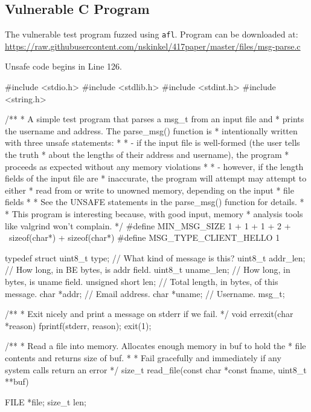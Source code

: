 \begin{appendices}

\chapter{Vulnerable C Program}
\label{app:vuln-full}

The vulnerable test program fuzzed using \texttt{afl}. Program can be
downloaded at: \url{https://raw.githubusercontent.com/nskinkel/417paper/master/files/msg-parse.c}

Unsafe code begins in Line 126.

\renewcommand\mylstcaption{Caption goes here.}
\begin{TCBlisting}[language={[ANSI]C},basicstyle=\scriptsize,caption={\mylstcaption}]
#include <stdio.h>
#include <stdlib.h>
#include <stdint.h>
#include <string.h>

/**
 * A simple test program that parses a msg_t from an input file and 
 * prints the username and address. The parse_msg() function is
 * intentionally written with three unsafe statements:
 *
 *     - if the input file is well-formed (the user tells the truth
 *       about the lengths of their address and username), the program
 *       proceeds as expected without any memory violations
 *
 *     - however, if the length fields of the input file are
 *       inaccurate, the program will attempt may attempt to either
 *       read from or write to unowned memory, depending on the input
 *       file fields
 *
 * See the UNSAFE statements in the parse_msg() function for details.
 *
 * This program is interesting because, with good input, memory
 * analysis tools like valgrind won't complain.
 */
#define MIN_MSG_SIZE 1 + 1 + 1 + 2 + \
                     sizeof(char*) + sizeof(char*)
#define MSG_TYPE_CLIENT_HELLO 1

typedef struct {
    uint8_t type;       // What kind of message is this?
    uint8_t addr_len;   // How long, in BE bytes, is addr field.
    uint8_t uname_len;  // How long, in bytes, is uname field.
    unsigned short len; // Total length, in bytes, of this message.
    char *addr;         // Email address.
    char *uname;        // Username.
} msg_t;

/**
 * Exit nicely and print a message on stderr if we fail.
 */
void
errexit(char *reason) {
    fprintf(stderr, reason);
    exit(1);
}

/**
 * Read a file into memory. Allocates enough memory in buf to hold the
 * file contents and returns size of buf.
 *
 * Fail gracefully and immediately if any system calls return an error
 */
size_t
read_file(const char *const fname, uint8_t **buf) {
   	FILE *file;
	size_t len;

}
\end{TCBlisting}
\end{appendices}
